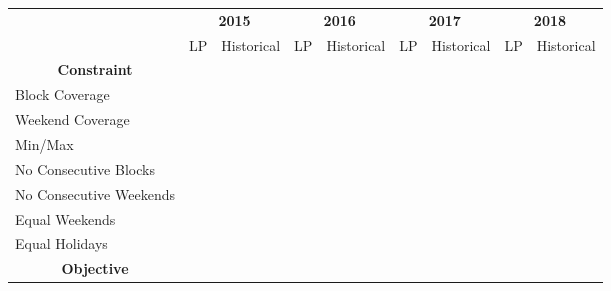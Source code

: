 \begin{table}[htbp]
	\centering
	\begin{tabular}{l|cc|cc|cc|cc}
		\multirow{2}[1]{*}{}                     & \multicolumn{2}{c|}{\textbf{2015}} & \multicolumn{2}{c|}{\textbf{2016}} & \multicolumn{2}{c|}{\textbf{2017}} & \multicolumn{2}{c}{\textbf{2018}} \\
		                                         &     LP     &      Historical       &     LP     &      Historical       &     LP     &      Historical       &     LP     &      Historical      \\ \midrule
		\multicolumn{1}{c|}{\textbf{Constraint}} &            &                       &            &                       &            &                       &            &                      \\ \midrule
		Block Coverage                           & \checkmark &      \checkmark       & \checkmark &      \checkmark       & \checkmark &      \checkmark       & \checkmark &      \checkmark      \\
		Weekend Coverage                         & \checkmark &      \checkmark       & \checkmark &      \checkmark       & \checkmark &      \checkmark       & \checkmark &      \checkmark      \\
		Min/Max                                  & \checkmark &      \checkmark       & \checkmark &      \checkmark       & \checkmark &      \checkmark       & \checkmark &      \checkmark      \\
		No Consecutive Blocks                    & \checkmark &                       & \checkmark &                       & \checkmark &                       & \checkmark &                      \\
		No Consecutive Weekends                  & \checkmark &                       & \checkmark &                       & \checkmark &      \checkmark       & \checkmark &      \checkmark      \\
		Equal Weekends                           & \checkmark &                       & \checkmark &                       & \checkmark &                       & \checkmark &                      \\
		Equal Holidays                           & \checkmark &                       & \checkmark &      \checkmark       & \checkmark &                       & \checkmark &      \checkmark      \\ \midrule
		\multicolumn{1}{c|}{\textbf{Objective}}  &            &                       &            &                       &            &                       &            &                      \\ \midrule

\end{tabular}
\end{table}
